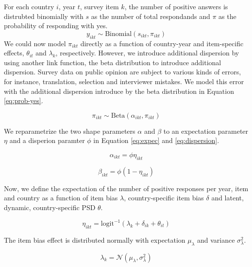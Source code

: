 \documentclass[12pt,english,a4paper,oneside]{article}
\theoremstyle{definition}
\theoremstyle{definition}
\theoremstyle{definition}
\theoremstyle{definition}
\theoremstyle{remark}
\begin{document}
\noindent
For each country \(i\), year \(t\), survey item \(k\), the number of positive answers is distrubted binomially with \(s\) as the number of total respondands and \(\pi\) as the probability of responding with yes.
\begin{equation}
\label{eq:num-resp}
y_{ikt} \sim \text{Binomial}(s_{ikt}, \pi_{ikt})
\end{equation}
We could now model \(\pi_{ikt}\) directly as a function of country-year and item-specific effects, \(\theta_{it}\) and \(\lambda_k\), respectively. However, we introduce additional dispersion by using another link function, the beta distribution to introduce additional dispersion. Survey data on public opinion are subject to various kinds of errors, for instance, translation, selection and interviewer mistakes. We model this error with the additional dispersion introduce by the beta distribution in Equation \eqref{eq:prob-yes}.

\begin{equation}
\label{eq:prob-yes}
\pi_{ikt} \sim \text{Beta}(\alpha_{ikt}, \pi_{ikt})
\end{equation}

\noindent
We reparametrize the two shape parameters \(\alpha\) and \(\beta\) to an expectation parameter \(\eta\) and a disperion paramter \(\phi\) in Equation \eqref{eq:expec} and \eqref{eq:dispersion}.

\begin{equation}
\label{eq:expec}
\alpha_{ikt} = \phi \eta_{ikt}
\end{equation}

\begin{equation}
\label{eq:dispersion}
\beta_{ikt} = \phi (1 - \eta_{ikt})
\end{equation}

\noindent
Now, we define the expectation of the number of positive responses per year, item and country as a function of item bias \(\lambda\), country-specific item bias \(\delta\) and latent, dynamic, country-specific PSD \(\theta\).

\begin{equation}
\label{eq:latent-country-year}
\eta_{ikt} = \text{logit}^{-1}(\lambda_k + \delta_{ik} + \theta_{it})
\end{equation}

\noindent
The item bias effect is distributed normally with expectation \(\mu_{\lambda}\) and variance \(\sigma_{\lambda}^2\).

\begin{equation}
\label{eq:item-intercept}
\lambda_k = \mathcal{N}(\mu_{\lambda}, \sigma_{\lambda}^2)
\end{equation}
\end{document}

